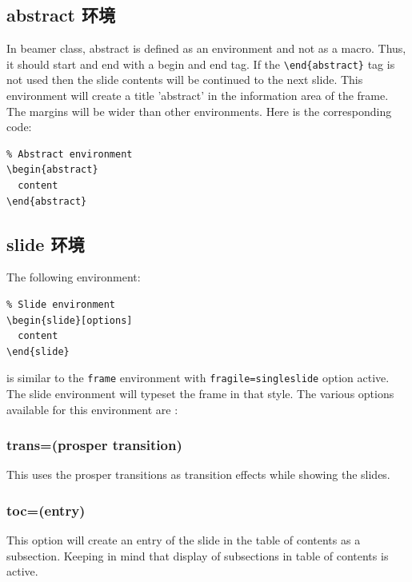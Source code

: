 \subsection{{\ttfamily abstract} 环境}

In beamer class, {\ttfamily abstract} is defined as an environment and not as a macro. Thus, it should start and end with a begin and end tag. If the \verb|\end{abstract}| tag is not used then the slide contents will be continued to the next slide. This environment will create a title ’abstract’ in the information area of the frame. The margins will be wider than other
environments. Here is the corresponding code:

\begin{verbatim}
% Abstract environment
\begin{abstract}
  content
\end{abstract}
\end{verbatim}

\subsection{{\ttfamily slide} 环境}

The following environment:

\begin{verbatim}
% Slide environment
\begin{slide}[options]
  content
\end{slide}
\end{verbatim}

is similar to the \verb|frame| environment with \verb|fragile=singleslide| option active. The slide environment will typeset the frame in that style. The various options available for this environment are :

\subsubsection{{\ttfamily trans=(prosper transition)}}
This uses the prosper transitions as transition effects while showing the slides.

\subsubsection{{\ttfamily toc=(entry)}}
This option will create an entry of the slide in the table of contents as a subsection. Keeping in mind that display of subsections in table of contents is active.


